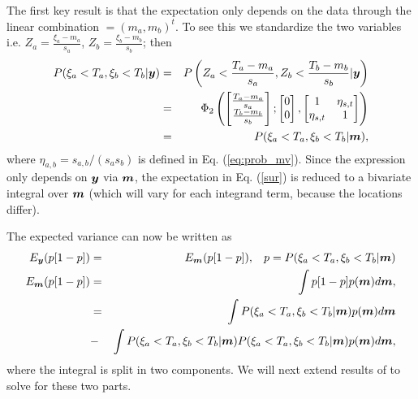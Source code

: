 \documentclass[aoas]{imsart}
\begin{document}
The first key result is that the expectation only depends on the data through the linear combination $\bm=(m_{a},m_{b})^t$. 
To see this we standardize the two variables i.e.
$Z_a=\frac{\xi_a-m_{a}}{s_{a}}$,
$Z_b=\frac{\xi_b-m_{b}}{s_{b}}$; 
then
\begin{eqnarray}
   P(\xi_a < T_a, \xi_b < T_b|\by) &=& P \left( Z_a <\frac{T_a-m_{a}}{s_{a}}, Z_b <\frac{T_b-m_{b}}{s_{b}}|\by \right) \nonumber \\
   &=& \Phi_2 \begin{pmatrix} 
\begin{bmatrix} \frac{T_a-m_{a}}{s_{a}}\\
\frac{T_b-m_{b}}{s_{b}}
\end{bmatrix};
 \begin{bmatrix} 0\\
0
\end{bmatrix},\begin{bmatrix}
1 & \eta_{s,t}  \\
\eta_{s,t}   & 1  
\end{bmatrix}\end{pmatrix} \nonumber \\
&=& P(\xi_a < T_a, \xi_b < T_b|\bm),
\end{eqnarray}
where $\eta_{a,b} =s_{a,b}/(s_{a} s_{b})$ is defined in Eq. (\ref{eq:prob_mv}).
Since the expression only depends on ${\boldsymbol y}$ via ${\boldsymbol m}$, the expectation in Eq. (\ref{sur}) is reduced to a bivariate integral over ${\boldsymbol m}$ (which will vary for each integrand term, because the locations differ). 

The expected variance can now be written as
\begin{eqnarray}\label{eq:var2}
E_{\by}(p[1-p]) &=& E_{\bm}(p[1-p]), \hspace{3mm} p=P(\xi_a < T_a, \xi_b < T_b|\bm) \nonumber \\
E_{\bm}(p[1-p]) & = & \int p[1-p] p(\bm) d\bm, \nonumber \\
 &=& \int P(\xi_a < T_a, \xi_b < T_b|\bm)  p(\bm) d\bm \nonumber  \\
&-& \int P(\xi_a < T_a, \xi_b < T_b|\bm) P(\xi_a < T_a, \xi_b < T_b|\bm) p(\bm) d\bm, 
\end{eqnarray}
where the integral is split in two components.
We will next extend results of \cite{chevalier2014fast} to solve for these two parts.
\end{document}
